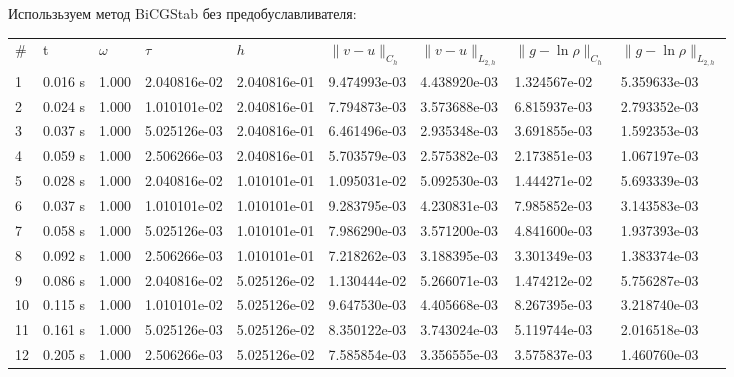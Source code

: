 \documentclass[12pt]{article}
\begin{document}
Использьзуем метод BiCGStab без предобуславливателя:

\begin{center}
\begin{tabular}{lllllllll}
\# & t & $\omega$ & $\tau$ & $h$ & $\|v - u\|_{C_h}$ & $\|v - u\|_{L_{2,h}}$ & $\|g - \ln\rho\|_{C_h}$ & $\|g - \ln\rho\|_{L_{2,h}}$ \\

1&      0.016 s&      1.000&      2.040816e-02&      2.040816e-01&      9.474993e-03&      4.438920e-03&      1.324567e-02&      5.359633e-03\\
2&      0.024 s&      1.000&      1.010101e-02&      2.040816e-01&      7.794873e-03&      3.573688e-03&      6.815937e-03&      2.793352e-03\\
3&      0.037 s&      1.000&      5.025126e-03&      2.040816e-01&      6.461496e-03&      2.935348e-03&      3.691855e-03&      1.592353e-03\\
4&      0.059 s&      1.000&      2.506266e-03&      2.040816e-01&      5.703579e-03&      2.575382e-03&      2.173851e-03&      1.067197e-03\\
5&      0.028 s&      1.000&      2.040816e-02&      1.010101e-01&      1.095031e-02&      5.092530e-03&      1.444271e-02&      5.693339e-03\\
6&      0.037 s&      1.000&      1.010101e-02&      1.010101e-01&      9.283795e-03&      4.230831e-03&      7.985852e-03&      3.143583e-03\\
7&      0.058 s&      1.000&      5.025126e-03&      1.010101e-01&      7.986290e-03&      3.571200e-03&      4.841600e-03&      1.937393e-03\\
8&      0.092 s&      1.000&      2.506266e-03&      1.010101e-01&      7.218262e-03&      3.188395e-03&      3.301349e-03&      1.383374e-03\\
9&      0.086 s&      1.000&      2.040816e-02&      5.025126e-02&      1.130444e-02&      5.266071e-03&      1.474212e-02&      5.756287e-03\\
10&      0.115 s&      1.000&      1.010101e-02&      5.025126e-02&      9.647530e-03&      4.405668e-03&      8.267395e-03&      3.218740e-03\\
11&      0.161 s&      1.000&      5.025126e-03&      5.025126e-02&      8.350122e-03&      3.743024e-03&      5.119744e-03&      2.016518e-03\\
12&      0.205 s&      1.000&      2.506266e-03&      5.025126e-02&      7.585854e-03&      3.356555e-03&      3.575837e-03&      1.460760e-03\\

\end{tabular}
\end{center}
\end{document}
